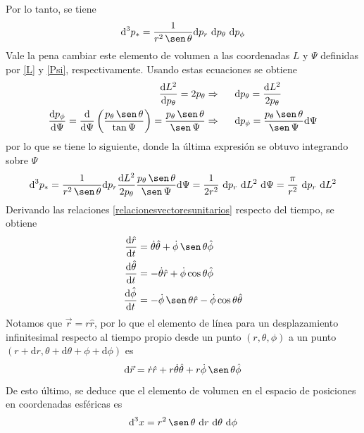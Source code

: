 \documentclass[11pt,twoside,openright,spanish]{report}
\numberwithin{equation}{chapter}
\numberwithin{figure}{chapter}
\numberwithin{table}{chapter}
\renewcommand{\sin}{\operatorname{\sen}}
\begin{document}
Por lo tanto, se tiene
\begin{equation}
\text{d}^3p_*=\frac{1}{r^2\sin\theta}\text{d}p_r\ \text{d}p_\theta\ \text{d}p_\phi
\end{equation}
Vale la pena cambiar este elemento de volumen a las coordenadas $L$ y $\Psi$ definidas por \eqref{L} y \eqref{Psi}, respectivamente. Usando estas ecuaciones se obtiene
\begin{eqnarray}
\frac{\text{d}L^2}{\text{d}p_\theta}=2p_\theta & \Rightarrow \hspace{0.5cm} \text{d}p_\theta=\frac{\text{d}L^2}{2p_\theta}\\
\frac{\text{d}p_\phi}{\text{d}\Psi}=\frac{\text{d}}{\text{d}\Psi}\left(\frac{p_\theta\sin\theta}{\tan\Psi}\right)=\frac{p_\theta\sin\theta}{\sin\Psi} & \Rightarrow \hspace{0.5cm} \text{d}p_\phi=\frac{p_\theta\sin\theta}{\sin\Psi}\text{d}\Psi
\end{eqnarray}
por lo que se tiene lo siguiente, donde la última expresión se obtuvo integrando sobre $\Psi$
\begin{equation}
\text{d}^3p_*=\frac{1}{r^2\sin\theta}\text{d}p_r\frac{\text{d}L^2}{2p_\theta}\frac{p_\theta\sin\theta}{\sin\Psi}\text{d}\Psi=\frac{1}{2r^2}\ \text{d}p_r\ \text{d}L^2\ \text{d}\Psi=\frac{\pi}{r^2}\ \text{d}p_r\ \text{d}L^2
\label{volmomelm}
\end{equation}
Derivando las relaciones \eqref{relacionesvectoresunitarios} respecto del tiempo, se obtiene
\begin{subequations}
\begin{align}
\frac{\text{d}\hat{r}}{\text{d}t}&=\dot{\theta}\hat{\theta}+\dot{\phi}\sin\theta\hat{\phi}\\
\frac{\text{d}\hat{\theta}}{\text{d}t}&=-\dot{\theta}\hat{r}+\dot{\phi}\cos\theta\hat{\phi}\\
\frac{\text{d}\hat{\phi}}{\text{d}t}&=-\dot{\phi}\sin\theta\hat{r}-\dot{\phi}\cos\theta\hat{\theta}
\end{align}
\end{subequations}
Notamos que $\vec{r}=r\hat{r}$, por lo que el elemento de línea para un desplazamiento infinitesimal respecto al tiempo propio desde un punto $(r,\theta,\phi)$ a un punto $(r+\text{d}r,\theta+\text{d}\theta+\phi+\text{d}\phi)$ es
\begin{equation}
\text{d}\vec{r}=\dot{r}\hat{r}+r\dot{\theta}\hat{\theta}+r\dot{\phi}\sin\theta\hat{\phi}
\end{equation}
De esto último, se deduce que el elemento de volumen en el espacio de posiciones en coordenadas esféricas es
\begin{equation}
\text{d}^3x=r^2\sin\theta\ \text{d}r\ \text{d}\theta\ \text{d}\phi
\label{volespelm}
\end{equation}
\end{document}
